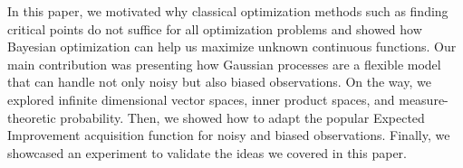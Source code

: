 In this paper, we motivated why classical optimization methods such as finding
critical points do not suffice for all optimization problems and showed how
Bayesian optimization can help us maximize unknown continuous functions.
Our main contribution was presenting how Gaussian processes are a flexible model that
can handle not only noisy but also biased observations.
On the way, we explored infinite dimensional vector spaces, inner product spaces, and measure-theoretic probability.
Then, we showed how to adapt the popular Expected Improvement acquisition function for noisy and biased observations.
Finally, we showcased an experiment to validate the ideas we covered in this paper.


